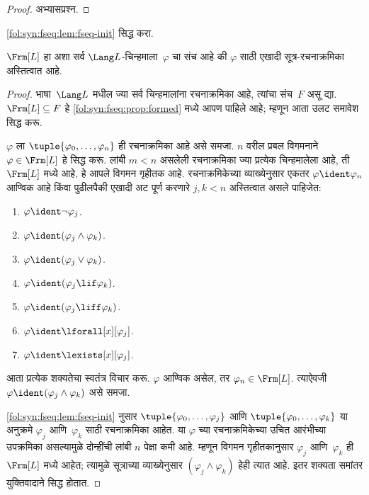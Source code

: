 \begin{proof}
अभ्यासप्रश्न.
\end{proof}

\begin{prob}
\ref{fol:syn:fseq:lem:fseq-init} सिद्ध करा.
\end{prob}

\begin{thm}
\label{fol:syn:fseq:thm:fseq-frm-equiv}
$\Frm[L]$ हा अशा सर्व $\Lang L$-चिन्हमाला~$\varphi$ चा संच आहे की $\varphi$
साठी एखादी सूत्र-रचनाक्रमिका अस्तित्वात आहे.
\end{thm}

\begin{proof}
भाषा~$\Lang L$ मधील ज्या सर्व चिन्हमालांना रचनाक्रमिका आहे, त्यांचा
संच~$F$ असू द्या. $\Frm[L] \subseteq F$ हे
\ref{fol:syn:fseq:prop:formed} मध्ये आपण पाहिले आहे; म्हणून आता उलट
समावेश सिद्ध करू.

$\varphi$ ला $\tuple{\varphi_0,\dotsc,\varphi_n}$ ही रचनाक्रमिका आहे असे समजा.
$n$ वरील प्रबल विगमनाने $\varphi \in \Frm[L]$ हे सिद्ध करू. लांबी
$m < n$ असलेली रचनाक्रमिका ज्या प्रत्येक चिन्हमालेला आहे, ती
$\Frm[L]$ मध्ये आहे, हे आपले विगमन गृहीतक आहे. रचनाक्रमिकेच्या
व्याख्येनुसार एकतर $\varphi \ident \varphi_n$ आण्विक आहे किंवा पुढीलपैकी एखादी
अट पूर्ण करणारे $j,k < n$ अस्तित्वात असले पाहिजेत:
\begin{enumerate}
    \item $\varphi \ident \lnot \varphi_j$.
    \item $\varphi \ident (\varphi_j \land \varphi_k)$.
    \item $\varphi \ident (\varphi_j \lor \varphi_k)$.
    \item $\varphi \ident (\varphi_j \lif \varphi_k)$.
    \item $\varphi \ident (\varphi_j \liff \varphi_k)$.
    \item $\varphi \ident \lforall[x][\varphi_j]$.
    \item $\varphi \ident \lexists[x][\varphi_j]$.
\end{enumerate}
आता प्रत्येक शक्यतेचा स्वतंत्र विचार करू. $\varphi$ आण्विक असेल, तर
$\varphi_n \in \Frm[L]$. त्याऐवजी $\varphi \ident (\varphi_j \land \varphi_k)$ असे समजा.


\ref{fol:syn:fseq:lem:fseq-init} नुसार
$\tuple{\varphi_0,\dotsc,\varphi_j}$ आणि $\tuple{\varphi_0,\dotsc,\varphi_k}$ या अनुक्रमे
$\varphi_j$ आणि~$\varphi_k$ साठी रचनाक्रमिका आहेत. या $\varphi$ च्या
रचनाक्रमिकेच्या उचित आरंभीच्या उपक्रमिका असल्यामुळे दोन्हींची लांबी
$n$ पेक्षा कमी आहे. म्हणून विगमन गृहीतकानुसार $\varphi_j$ आणि~$\varphi_k$ ही
$\Frm[L]$ मध्ये आहेत; त्यामुळे सूत्राच्या व्याख्येनुसार
$(\varphi_j \land \varphi_k)$ हेही त्यात आहे. इतर शक्यता समांतर युक्तिवादाने
सिद्ध होतात.
\end{proof}

